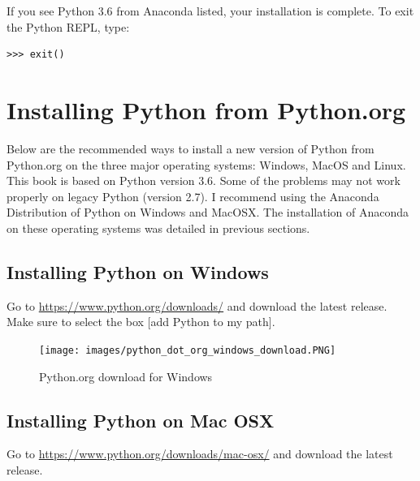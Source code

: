 \documentclass{book}
\begin{document}
If you see Python 3.6 from Anaconda listed, your installation is
complete. To exit the Python REPL, type:

\begin{lstlisting}
>>> exit()
\end{lstlisting}
    




    
        \section{Installing Python from
Python.org}\label{installing-python-from-python.org}
    




    
        Below are the recommended ways to install a new version of Python from
Python.org on the three major operating systems: Windows, MacOS and
Linux. This book is based on Python version 3.6. Some of the problems
may not work properly on legacy Python (version 2.7). I recommend using
the Anaconda Distribution of Python on Windows and MacOSX. The
installation of Anaconda on these operating systems was detailed in
previous sections.
    




    
        \subsection{Installing Python on
Windows}\label{installing-python-on-windows}

Go to \url{https://www.python.org/downloads/} and download the latest
release. Make sure to select the box {[}add Python to my path{]}.

\begin{figure}
\centering
\texttt{[image: images/python\_dot\_org\_windows\_download.PNG]}
\caption{Python.org download for Windows}
\end{figure}
    




    
        \subsection{Installing Python on Mac
OSX}\label{installing-python-on-mac-osx}

Go to \url{https://www.python.org/downloads/mac-osx/} and download the
latest release.
\end{document}
